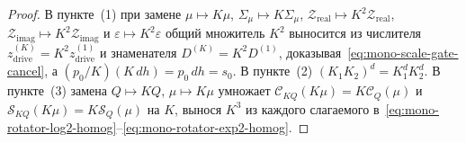 \begin{theorem}[Сокращение масштаба $A = K\cdot dh$, размерность Хаусдорфа--Морана $D_H = 3$ ячейки Вороного и проективные операторы логарифма $\log_a(b)$ и рациональной степени $a^{p/q}$ на $\mathbb{Z}_{4Q}$]
\begin{enumerate}[label=\textbf{(\arabic*)},leftmargin=*]
\end{enumerate}
\end{theorem}

\begin{proof}
В пункте~(1) при замене $\mu \mapsto K\mu$, $\Sigma_\mu \mapsto K\Sigma_\mu$, $\mathcal{Z}_{\mathrm{real}} \mapsto K^2\mathcal{Z}_{\mathrm{real}}$, $\mathcal{Z}_{\mathrm{imag}} \mapsto K^2\mathcal{Z}_{\mathrm{imag}}$ и $\varepsilon \mapsto K^2\varepsilon$ общий множитель $K^2$ выносится из числителя $z_{\mathrm{drive}}^{(K)} = K^2 z_{\mathrm{drive}}^{(1)}$ и знаменателя $D^{(K)} = K^2 D^{(1)}$, доказывая~\eqref{eq:mono-scale-gate-cancel}, а $(p_0/K)(K\,dh) = p_0\,dh = s_0$. В пункте~(2) $(K_1 K_2)^d = K_1^d K_2^d$. В пункте~(3) замена $Q \mapsto K Q$, $\mu \mapsto K\mu$ умножает $\mathcal{C}_{KQ}(K\mu) = K\mathcal{C}_Q(\mu)$ и $\mathcal{S}_{KQ}(K\mu) = K\mathcal{S}_Q(\mu)$ на $K$, вынося $K^3$ из каждого слагаемого в~\eqref{eq:mono-rotator-log2-homog}--\eqref{eq:mono-rotator-exp2-homog}.
\end{proof}


